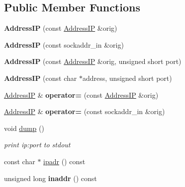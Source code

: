 \subsection*{Public Member Functions}
\begin{DoxyCompactItemize}
\item 
{\bfseries Address\+IP} (const \hyperlink{structAddressIP}{Address\+IP} \&orig)\hypertarget{structAddressIP_aacf78d7cc01060985b9c6fd1b6090c3c}{}\label{structAddressIP_aacf78d7cc01060985b9c6fd1b6090c3c}

\item 
{\bfseries Address\+IP} (const sockaddr\+\_\+in \&orig)\hypertarget{structAddressIP_a4dc9acdb8099790e91e46dd7216feb38}{}\label{structAddressIP_a4dc9acdb8099790e91e46dd7216feb38}

\item 
{\bfseries Address\+IP} (const \hyperlink{structAddressIP}{Address\+IP} \&orig, unsigned short port)\hypertarget{structAddressIP_ae87a8a25f38db58ef4229bdbf0b31872}{}\label{structAddressIP_ae87a8a25f38db58ef4229bdbf0b31872}

\item 
{\bfseries Address\+IP} (const char $\ast$address, unsigned short port)\hypertarget{structAddressIP_a8d0d4bb01b6cec7692b6deb3046b205e}{}\label{structAddressIP_a8d0d4bb01b6cec7692b6deb3046b205e}

\item 
\hyperlink{structAddressIP}{Address\+IP} \& {\bfseries operator=} (const \hyperlink{structAddressIP}{Address\+IP} \&orig)\hypertarget{structAddressIP_aedc23850a45c7d06d59af9985efe2103}{}\label{structAddressIP_aedc23850a45c7d06d59af9985efe2103}

\item 
\hyperlink{structAddressIP}{Address\+IP} \& {\bfseries operator=} (const sockaddr\+\_\+in \&orig)\hypertarget{structAddressIP_a9812d56d8c0ac4662f329374d0394256}{}\label{structAddressIP_a9812d56d8c0ac4662f329374d0394256}

\item 
void \hyperlink{structAddressIP_a0fda8148a8bd707be92114cf27df7780}{dump} ()\hypertarget{structAddressIP_a0fda8148a8bd707be92114cf27df7780}{}\label{structAddressIP_a0fda8148a8bd707be92114cf27df7780}

\begin{DoxyCompactList}\small\item\em print ip\+:port to stdout \end{DoxyCompactList}\item 
const char $\ast$ \hyperlink{structAddressIP_a07b7880ac5c27ce1791ddaf20d6503ce}{ipadr} () const 
\item 
unsigned long {\bfseries inaddr} () const \hypertarget{structAddressIP_ae445286f71691d07444290e2234d818a}{}\label{structAddressIP_ae445286f71691d07444290e2234d818a}

\end{DoxyCompactItemize}
